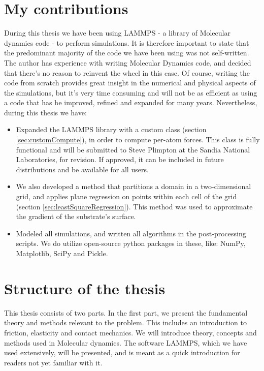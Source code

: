 \documentclass[twoside,english]{uiofysmaster}
\begin{document}
\section{My contributions}
During this thesis we have been using LAMMPS - a library of Molecular dynamics code - to perform simulations. 
It is therefore important to state that the predominant majority of the code we have been using was not self-written.
The author has experience with writing Molecular Dynamics code, and decided that there's no reason to reinvent the wheel in this case. 
Of course, writing the code from scratch provides great insight in the numerical and physical aspects of the simulations, but it's very time consuming and will not be as efficient as using a code that has be improved, refined and expanded for many years.
Nevertheless, during this thesis we have:	
\begin{itemize}
\item Expanded the LAMMPS library with a custom class (section \ref{sec:customCompute}), in order to compute per-atom forces. 
This class is fully functional and will be submitted to Steve Plimpton at the Sandia National Laboratories, for revision. 
If approved, it can be included in future distributions and be available for all users. 

\item We also developed a method that partitions a domain in a two-dimensional grid, and applies plane regression on points within each cell of the grid (section \ref{sec:leastSquareRegression}).  
This method was used to approximate the gradient of the substrate's surface.

\item Modeled all simulations, and written all algorithms in the post-processing scripts. We do utilize open-source python packages in these, like: NumPy, Matplotlib, SciPy and Pickle.

\end{itemize}

\section{Structure of the thesis}
This thesis consists of two parts. 
In the first part, we present the fundamental theory and methods relevant to the problem. 
This includes an introduction to friction, elasticity and contact mechanics.
We will introduce theory, concepts and methods used in Molecular dynamics. 
The software LAMMPS, which we have used extensively, will be presented, and is meant as a quick introduction for readers not yet familiar with it. 
\end{document}
